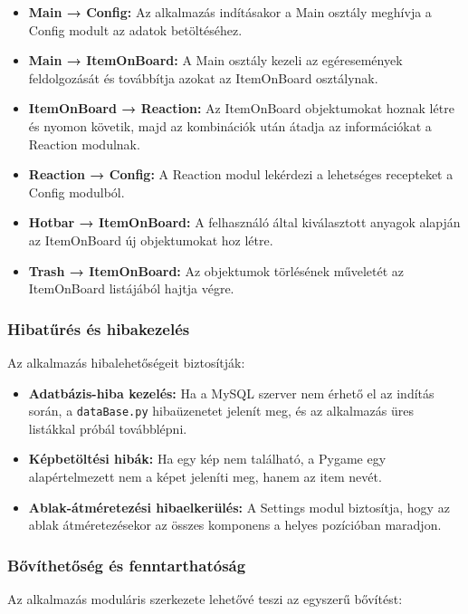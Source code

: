 \documentclass[]{thesis-ekf}
\begin{document}
	\begin{itemize}
		\item \textbf{Main → Config:} Az alkalmazás indításakor a Main osztály meghívja a Config modult az adatok betöltéséhez.
		
		\item \textbf{Main → ItemOnBoard:} A Main osztály kezeli az egéresemények feldolgozását és továbbítja azokat az ItemOnBoard osztálynak.
		
		\item \textbf{ItemOnBoard → Reaction:} Az ItemOnBoard objektumokat hoznak létre és nyomon követik, majd az kombinációk után átadja az információkat a Reaction modulnak.
		
		\item \textbf{Reaction → Config:} A Reaction modul lekérdezi a lehetséges recepteket a Config modulból.
		
		\item \textbf{Hotbar → ItemOnBoard:} A felhasználó által kiválasztott anyagok alapján az ItemOnBoard új objektumokat hoz létre.
		
		\item \textbf{Trash → ItemOnBoard:} Az objektumok törlésének műveletét az ItemOnBoard listájából hajtja végre.
	\end{itemize}
	
	
	\subsubsection{Hibatűrés és hibakezelés}
	
	Az alkalmazás hibalehetőségeit biztosítják:
	
	\begin{itemize}
		\item \textbf{Adatbázis-hiba kezelés:} Ha a MySQL szerver nem érhető el az indítás során, a \texttt{dataBase.py} hibaüzenetet jelenít meg, és az alkalmazás üres listákkal próbál továbblépni.
		
		\item \textbf{Képbetöltési hibák:} Ha egy kép nem található, a Pygame egy alapértelmezett nem a képet jeleníti meg, hanem az item nevét.
		
		\item \textbf{Ablak-átméretezési hibaelkerülés:} A Settings modul biztosítja, hogy az ablak átméretezésekor az összes komponens a helyes pozícióban maradjon.
	\end{itemize}
	
	\subsubsection{Bővíthetőség és fenntarthatóság}
	Az alkalmazás moduláris szerkezete lehetővé teszi az egyszerű bővítést:
	
\end{document}
